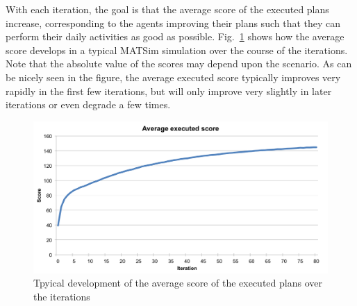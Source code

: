 With each iteration, the goal is that the average score of the executed plans
increase, corresponding to the agents improving their plans such that they can
perform their daily activities as good as possible.
Fig.~\ref{fig:overview:scores} shows how the average score develops in a typical
MATSim simulation over the course of the iterations. Note that the absolute
value of the scores may depend upon the scenario. As can be nicely seen in the
figure, the average executed score typically improves very rapidly in the first
few iterations, but will only improve very slightly in later iterations or even
degrade a few times.


\begin{figure}[htp]
\begin{center}
  \includegraphics[width=.9\textwidth]{figures/overview/scorestats.png}
  \caption{Tpyical development of the average score of the executed plans over
  the iterations}
  \label{fig:overview:scores}
\end{center}
\end{figure}


